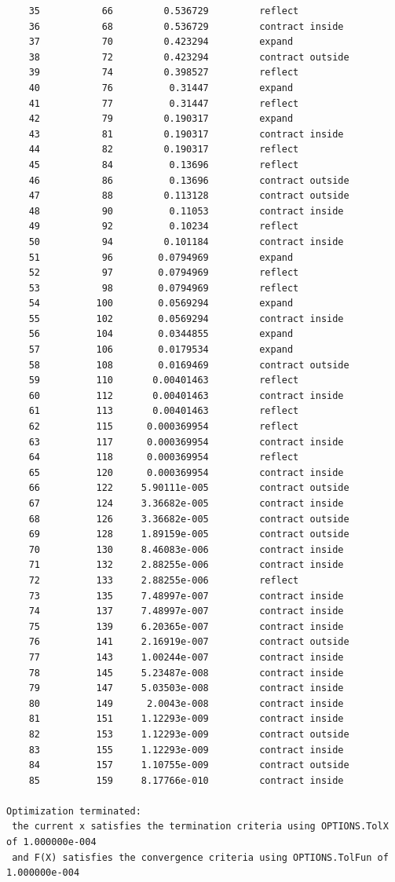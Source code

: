 \begin{lstlisting}
    35           66         0.536729         reflect
    36           68         0.536729         contract inside
    37           70         0.423294         expand
    38           72         0.423294         contract outside
    39           74         0.398527         reflect
    40           76          0.31447         expand
    41           77          0.31447         reflect
    42           79         0.190317         expand
    43           81         0.190317         contract inside
    44           82         0.190317         reflect
    45           84          0.13696         reflect
    46           86          0.13696         contract outside
    47           88         0.113128         contract outside
    48           90          0.11053         contract inside
    49           92          0.10234         reflect
    50           94         0.101184         contract inside
    51           96        0.0794969         expand
    52           97        0.0794969         reflect
    53           98        0.0794969         reflect
    54          100        0.0569294         expand
    55          102        0.0569294         contract inside
    56          104        0.0344855         expand
    57          106        0.0179534         expand
    58          108        0.0169469         contract outside
    59          110       0.00401463         reflect
    60          112       0.00401463         contract inside
    61          113       0.00401463         reflect
    62          115      0.000369954         reflect
    63          117      0.000369954         contract inside
    64          118      0.000369954         reflect
    65          120      0.000369954         contract inside
    66          122     5.90111e-005         contract outside
    67          124     3.36682e-005         contract inside
    68          126     3.36682e-005         contract outside
    69          128     1.89159e-005         contract outside
    70          130     8.46083e-006         contract inside
    71          132     2.88255e-006         contract inside
    72          133     2.88255e-006         reflect
    73          135     7.48997e-007         contract inside
    74          137     7.48997e-007         contract inside
    75          139     6.20365e-007         contract inside
    76          141     2.16919e-007         contract outside
    77          143     1.00244e-007         contract inside
    78          145     5.23487e-008         contract inside
    79          147     5.03503e-008         contract inside
    80          149      2.0043e-008         contract inside
    81          151     1.12293e-009         contract inside
    82          153     1.12293e-009         contract outside
    83          155     1.12293e-009         contract inside
    84          157     1.10755e-009         contract outside
    85          159     8.17766e-010         contract inside
 
Optimization terminated:
 the current x satisfies the termination criteria using OPTIONS.TolX of 1.000000e-004 
 and F(X) satisfies the convergence criteria using OPTIONS.TolFun of 1.000000e-004 
\end{lstlisting}

